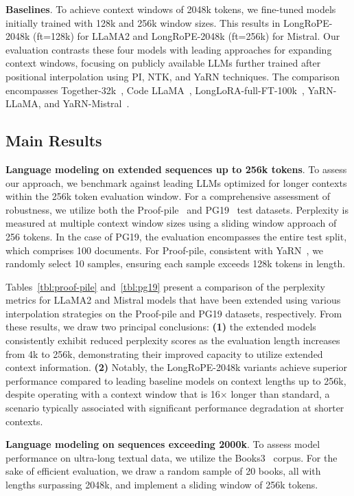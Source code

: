 \textbf{Baselines}. To achieve context windows of 2048k tokens, we fine-tuned models initially trained with 128k and 256k window sizes. This results in LongRoPE-2048k (ft=128k) for LLaMA2 and LongRoPE-2048k (ft=256k) for Mistral. Our evaluation contrasts these four models with leading approaches for expanding context windows, focusing on publicly available LLMs further trained after positional interpolation using PI, NTK, and YaRN techniques. The comparison encompasses Together-32k~\cite{together}, Code LLaMA~\cite{codellama}, LongLoRA-full-FT-100k~\cite{longlora}, YaRN-LLaMA, and YaRN-Mistral~\cite{yarn}.

\subsection{Main Results}

\label{sec:mainresult}
\textbf{Language modeling on extended sequences up to 256k tokens}. To assess our approach, we benchmark against leading LLMs optimized for longer contexts within the 256k token evaluation window. For a comprehensive assessment of robustness, we utilize both the Proof-pile~\cite{pg19} and PG19~\cite{pile} test datasets. Perplexity is measured at multiple context window sizes using a sliding window approach of 256 tokens. In the case of PG19, the evaluation encompasses the entire test split, which comprises 100 documents. For Proof-pile, consistent with YaRN~\cite{yarn}, we randomly select 10 samples, ensuring each sample exceeds 128k tokens in length.

Tables~\ref{tbl:proof-pile} and~\ref{tbl:pg19} present a comparison of the perplexity metrics for LLaMA2 and Mistral models that have been extended using various interpolation strategies on the Proof-pile and PG19 datasets, respectively. From these results, we draw two principal conclusions: \textbf{(1)} the extended models consistently exhibit reduced perplexity scores as the evaluation length increases from 4k to 256k, demonstrating their improved capacity to utilize extended context information. \textbf{(2)} Notably, the LongRoPE-2048k variants achieve superior performance compared to leading baseline models on context lengths up to 256k, despite operating with a context window that is 16$\times$ longer than standard, a scenario typically associated with significant performance degradation at shorter contexts.

\textbf{Language modeling on sequences exceeding 2000k}. To assess model performance on ultra-long textual data, we utilize the Books3~\cite{pile} corpus. For the sake of efficient evaluation, we draw a random sample of 20 books, all with lengths surpassing 2048k, and implement a sliding window of 256k tokens.

